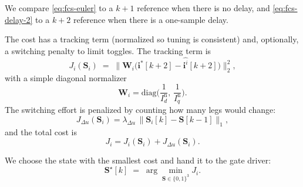 We compare \eqref{eq:fcs-euler} to a $k{+}1$ reference when there is no delay, and \eqref{eq:fcs-delay-2} to a $k{+}2$ reference when there is a one-sample delay.


The cost has a tracking term (normalized so tuning is consistent) and, optionally, a switching penalty to limit toggles. The tracking term is
\begin{equation}
\label{eq:fcs-Ji}
J_i(\mathbf S_{i}) \;=\; \big\| \mathbf W_i \big(\mathbf i^{\ast}[k{+}2]-\hat{\mathbf i^{i}}[k{+}2 ]\big) \big\|_2^2,
\end{equation}
with a simple diagonal normalizer
\begin{equation}
\label{eq:fcs-Wi}
\mathbf W_i=\mathrm{diag}\!\Big(\frac{1}{I_d^{\mathrm n}},\,\frac{1}{I_q^{\mathrm n}}\Big).
\end{equation}
The switching effort is penalized by counting how many legs would change:
\begin{equation}
\label{eq:fcs-Jdu}
J_{\Delta u}(\mathbf S_{i})=\lambda_{\Delta u}\,\big\|\mathbf S_{i}[k]-\mathbf S[k-1]\big\|_1,
\end{equation}
and the total cost is
\begin{equation}
\label{eq:fcs-J}
J_{i}=J_i(\mathbf S_{i})+J_{\Delta u}(\mathbf S_{i}).
\end{equation}

We choose the state with the smallest cost and hand it to the gate driver:
\begin{equation}
\label{eq:fcs-argmin}
\mathbf S^\star[k] \;=\; \arg\min_{\mathbf S\in\{0,1\}^3} J_{i}.
\end{equation}


